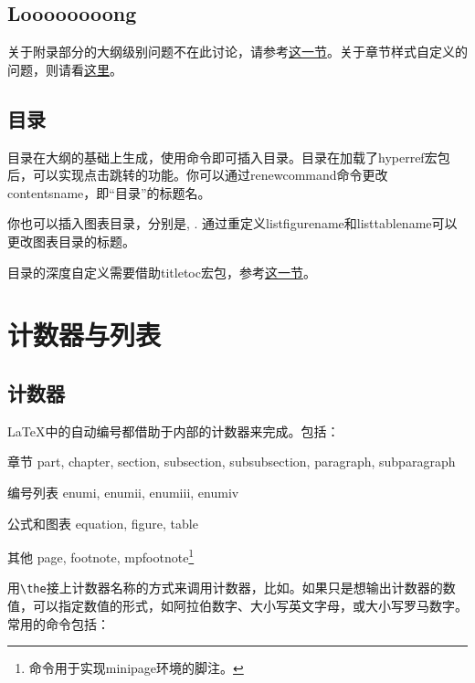 {\begin{latex}{}
\section[Short]{Loooooooong}
\end{latex}

关于附录部分的大纲级别问题不在此讨论，请参考\hyperref[sec:appendix]{这一节}。关于章节样式自定义的问题，则请看\hyperref[sec:titlesec]{这里}。

\subsection{目录}
目录在大纲的基础上生成，使用命令\latexline{\\tableofcontents}即可插入目录。目录在加载了hyperref宏包后，可以实现点击跳转的功能。你可以通过renewcommand命令更改contentsname，即“目录”的标题名。

你也可以插入图表目录，分别是\latexline{\\listoffigures}, \latexline{\\listoftables}. 通过重定义listfigurename和listtablename可以更改图表目录的标题。

目录的深度自定义需要借助titletoc宏包，参考\hyperref[sec:titletoc]{这一节}。

\section{计数器与列表}

\subsection{计数器}
\LaTeX 中的自动编号都借助于内部的计数器来完成。包括：
\begin{fead}
\item[章节] part, chapter, section, subsection, subsubsection, paragraph, subparagraph
\item[编号列表] enumi, enumii, enumiii, enumiv
\item[公式和图表] equation, figure, table
\item[其他] page, footnote, mpfootnote\footnote{\latexline{\\mpfootnote}命令用于实现minipage环境的脚注。}
\end{fead}

用\verb|\the|接上计数器名称的方式来调用计数器，比如\latexline{\\thechapter}。如果只是想输出计数器的数值，可以指定数值的形式，如阿拉伯数字、大小写英文字母，或大小写罗马数字。常用的命令包括：
\begin{latex}{}
\Alph \alph \Roman \roman
\end{latex}

}
